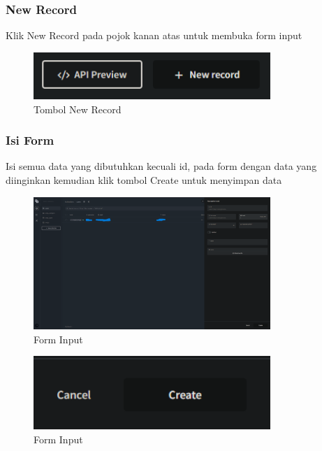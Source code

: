 \documentclass[a4paper, 12pt]{article}
\begin{document}
\subsubsection{New Record}
Klik New Record pada pojok kanan atas untuk membuka form input

\begin{figure}[H]
    \centering
    \includegraphics[width=0.8\textwidth]{assets/new-record.png}
    \caption{Tombol New Record}
\end{figure}

\subsubsection{Isi Form}
Isi semua data yang dibutuhkan kecuali id, pada form dengan data yang diinginkan kemudian klik tombol Create untuk menyimpan data

\begin{figure}[H]
    \centering
    \includegraphics[width=0.8\textwidth]{assets/form.png}
    \caption{Form Input}
\end{figure}

\begin{figure}[H]
    \centering
    \includegraphics[width=0.8\textwidth]{assets/create.png}
    \caption{Form Input}
\end{figure}
\end{document}
